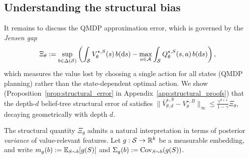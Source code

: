 

\subsection{Understanding the structural bias}
\label{sec:understanding_structural_bias}

It remains to discuss the QMDP approximation error, which is governed by the \emph{Jensen gap}
\begin{equation}
\Xi_\theta
:=
\sup_{b\in\Delta({\mathcal{S}})}
\left(
\int_{{\mathcal{S}}}V_\theta^{\star,S}(s)\,b(\mathrm ds)
-
\max_{a\in{\mathcal{A}}}\int_{{\mathcal{S}}}Q_\theta^{\star,S}(s,a)\,b(\mathrm ds)
\right),
\label{eq:Xi_def}
\end{equation}
which measures the value lost by choosing a single action for all states (QMDP planning) rather than the state-dependent optimal action. We show (Proposition~\ref{prop:structural_error} in Appendix~\ref{app:structural_proofs}) that the depth-$d$ belief-tree structural error of  satisfies $\|\bar V_{\theta,d}^{\star,S}-V_{\theta}^{\star,B}\|_\infty\le\frac{\gamma^{d+1}}{1-\gamma}\Xi_\theta$, decaying geometrically with depth $d$.

The structural quantity $\Xi_\theta$ admits a natural interpretation in terms of posterior \emph{variance} of value-relevant features. Let $g:{\mathcal{S}}\to{\mathbb{R}}^k$ be a measurable embedding, and write
$m_g(b):=\mathbb{E}_{S\sim b}[g(S)]$ and $\Sigma_g(b):=\mathrm{Cov}_{S\sim b}(g(S))$.

